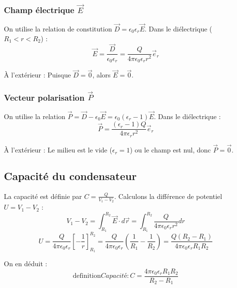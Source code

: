 \documentclass[french]{yLectureNote}
\renewcommand{\vec}{\overrightarrow}
\begin{document}
\subsubsection{Champ électrique $\vec{E}$}
On utilise la relation de constitution $\vec{D} = \epsilon_0 \epsilon_r \vec{E}$.
Dans le diélectrique ($R_1 < r < R_2$) :
    $$\vec{E} = \frac{\vec{D}}{\epsilon_0 \epsilon_r} = \frac{Q}{4\pi \epsilon_0 \epsilon_r r^2} \vec{e}_r$$

    À l'extérieur : Puisque $\vec{D} = \vec{0}$, alors $\vec{E} = \vec{0}$.

\subsubsection{Vecteur polarisation $\vec{P}$}
On utilise la relation $\vec{P} = \vec{D} - \epsilon_0 \vec{E} = \epsilon_0(\epsilon_r - 1)\vec{E}$.
Dans le diélectrique :
    $$\vec{P} = \frac{(\epsilon_r - 1)Q}{4\pi \epsilon_r r^2} \vec{e}_r$$

    À l'extérieur : Le milieu est le vide ($\epsilon_r = 1$) ou le champ est nul, donc $\vec{P} = \vec{0}$.


\subsection{Capacité du condensateur}

La capacité est définie par $C = \frac{Q}{V_1 - V_2}$. Calculons la différence de potentiel $U = V_1 - V_2$ :
$$V_1 - V_2 = \int_{R_1}^{R_2} \vec{E} \cdot d\vec{r} = \int_{R_1}^{R_2} \frac{Q}{4\pi \epsilon_0 \epsilon_r r^2} dr$$
$$U = \frac{Q}{4\pi \epsilon_0 \epsilon_r} \left[ -\frac{1}{r} \right]_{R_1}^{R_2} = \frac{Q}{4\pi \epsilon_0 \epsilon_r} \left( \frac{1}{R_1} - \frac{1}{R_2} \right) = \frac{Q(R_2 - R_1)}{4\pi \epsilon_0 \epsilon_r R_1 R_2}$$

On en déduit :
$$\text{definition}{Capacité} : C = \frac{4\pi \epsilon_0 \epsilon_r R_1 R_2}{R_2 - R_1}$$

\end{document}
